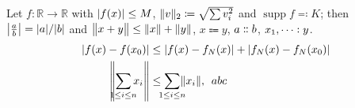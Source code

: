 \documentclass{article}
\DeclareMathOperator{\supp}{supp}
\DeclarePairedDelimiter{\abs}{\lvert}{\rvert}
\DeclarePairedDelimiter\norm{\lVert}{\rVert}
\begin{document}
Let $f\colon\mathbb{R}\to\mathbb{R}$ with $\abs{f(x)} \le M$, $\norm{v}_2 \coloneqq \sqrt{\sum v_i^2}$ and $\supp f \eqqcolon K$;
then $\abs*{\frac{a}{b}} = \abs{a}/\abs{b}$ and $\norm[\big]{x+y} \le \norm{x} + \norm{y}$, $x \Coloneqq y$, $a \dblcolon b$, $x_1,\dots\vcentcolon y$.
\begin{align}
  \abs{f(x)-f(x_0)} &\le \abs{f(x)-f_N(x)} + \abs{f_N(x)-f_N(x_0)} \\
  \norm*{\sum_{\mathclap{1\le i\le n}} x_i} &\le \sum_{\mathclap{1\le i\le n}} \norm{x_i}, \quad \mathllap{a}b\mathrlap{c}
\end{align}
\end{document}
